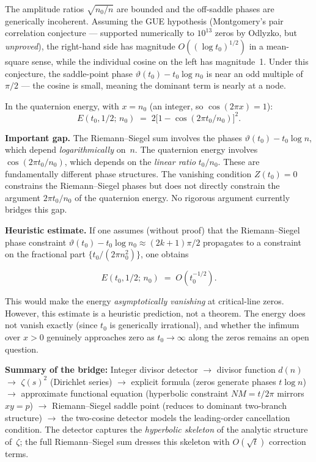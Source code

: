 \documentclass[12pt,a4paper]{article}
\begin{document}
\noindent The amplitude ratios $\sqrt{n_0/n}$ are bounded and the off-saddle phases are generically incoherent. Assuming the GUE hypothesis (Montgomery's pair correlation conjecture --- supported numerically to $10^{13}$ zeros by Odlyzko, but \emph{unproved}), the right-hand side has magnitude $O((\log t_0)^{1/2})$ in a mean-square sense, while the individual cosine on the left has magnitude~1. Under this conjecture, the saddle-point phase $\vartheta(t_0) - t_0\log n_0$ is near an odd multiple of $\pi/2$ --- the cosine is small, meaning the dominant term is nearly at a node.

In the quaternion energy, with $x = n_0$ (an integer, so $\cos(2\pi x) = 1$):
\[
E(t_0,1/2;\,n_0) \;=\; 2\bigl[1 - \cos(2\pi t_0/n_0)\bigr]^2.
\]

\begin{definitionbox}
\textbf{Important gap.} The Riemann--Siegel sum involves the phases $\vartheta(t_0) - t_0\log n$, which depend \emph{logarithmically} on~$n$. The quaternion energy involves $\cos(2\pi t_0/n_0)$, which depends on the \emph{linear ratio} $t_0/n_0$. These are fundamentally different phase structures. The vanishing condition $Z(t_0)=0$ constrains the Riemann--Siegel phases but does not directly constrain the argument $2\pi t_0/n_0$ of the quaternion energy. No rigorous argument currently bridges this gap.
\end{definitionbox}

\textbf{Heuristic estimate.} If one assumes (without proof) that the Riemann--Siegel phase constraint $\vartheta(t_0) - t_0\log n_0 \approx (2k+1)\pi/2$ propagates to a constraint on the fractional part $\{t_0/(2\pi n_0^2)\}$, one obtains

\begin{mathblock}
\[
E(t_0,1/2;\,n_0) \;=\; O(t_0^{-1/2}).
\]
\end{mathblock}

\noindent This would make the energy \emph{asymptotically vanishing} at critical-line zeros. However, this estimate is a heuristic prediction, not a theorem. The energy does not vanish exactly (since $t_0$ is generically irrational), and whether the infimum over $x > 0$ genuinely approaches zero as $t_0 \to \infty$ along the zeros remains an open question.

\begin{keypoint}
\textbf{Summary of the bridge:} Integer divisor detector $\to$ divisor function $d(n)$ $\to$ $\zeta(s)^2$ (Dirichlet series) $\to$ explicit formula (zeros generate phases $t\log n$) $\to$ approximate functional equation (hyperbolic constraint $NM = t/2\pi$ mirrors $xy=p$) $\to$ Riemann--Siegel saddle point (reduces to dominant two-branch structure) $\to$ the two-cosine detector models the leading-order cancellation condition. The detector captures the \emph{hyperbolic skeleton} of the analytic structure of~$\zeta$; the full Riemann--Siegel sum dresses this skeleton with $O(\sqrt{t})$ correction terms.
\end{keypoint}
\end{document}
